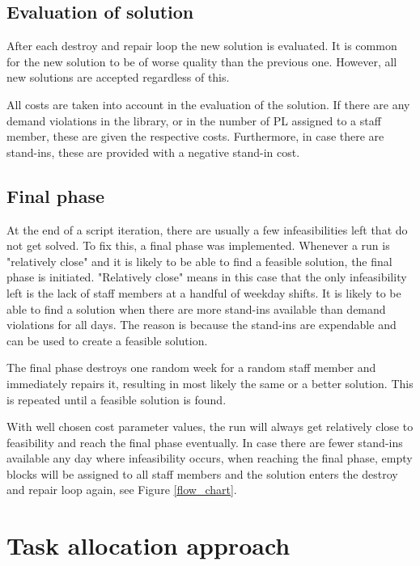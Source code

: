 \subsection{Evaluation of solution}
After each destroy and repair loop the new solution is evaluated. It is common for the new solution to be of worse quality than the previous one. However, all new solutions are accepted regardless of this.

All costs are taken into account in the evaluation of the solution. If there are any demand violations in the library, or in the number of PL assigned to a staff member, these are given the respective costs. Furthermore, in case there are stand-ins, these are provided with a negative stand-in cost. 
\subsection{Final phase}
At the end of a script iteration, there are usually a few infeasibilities left that do not get solved. To fix this, a final phase was implemented. Whenever a run is "relatively close" and it is likely to be able to find a feasible solution, the final phase is initiated. "Relatively close" means in this case that the only infeasibility left is the lack of staff members at a handful of weekday shifts. It is likely to be able to find a solution when there are more stand-ins available than demand violations for all days. The reason is because the stand-ins are expendable and can be used to create a feasible solution.

The final phase destroys one random week for a random staff member and immediately repairs it, resulting in most likely the same or a better solution. This is repeated until a feasible solution is found. %

With well chosen cost parameter values, the run will always get relatively close to feasibility and reach the final phase eventually. In case there are fewer stand-ins available any day where infeasibility occurs, when reaching the final phase, empty blocks will be assigned to all staff members and the solution enters the destroy and repair loop again, see Figure \ref{flow_chart}.

\section{Task allocation approach} \label{section:impl_task_dist}

